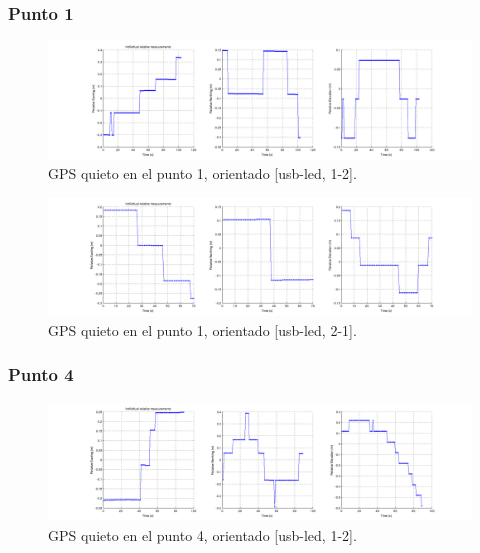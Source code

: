 \documentclass[spanish,12pt,a4paper,titlepage]{report}
\begin{document}
\subsubsection*{Punto 1}
\label{sec:punto-1}

\begin{figure}[h!]
  \hspace{-70pt}
  \includegraphics[width=1.3\textwidth]{./img/log_09_individual.png}
  \caption{GPS quieto en el punto 1, orientado [usb-led, 1-2].}
  \label{fig:log_09_individual.png}
\end{figure}

\begin{figure}[h!]
  \hspace{-70pt}
  \includegraphics[width=1.3\textwidth]{./img/log_10_individual.png}
  \caption{GPS quieto en el punto 1, orientado [usb-led, 2-1].}
  \label{fig:log_10_individual.png}
\end{figure}

\newpage
\subsubsection*{Punto 4}
\label{sec:punto-4}

\begin{figure}[h!]
  \hspace{-70pt}
  \includegraphics[width=1.3\textwidth]{./img/log_08_individual.png}
  \caption{GPS quieto en el punto 4, orientado [usb-led, 1-2].}
  \label{fig:log_08_individual.png}
\end{figure}
\end{document}
